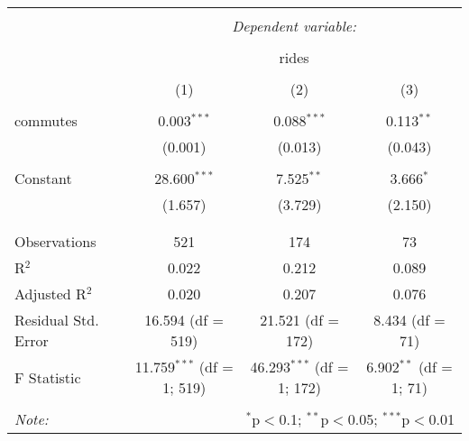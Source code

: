 
\begin{table}[!htbp] \centering 
  \caption{} 
  \label{} 
\begin{tabular}{@{\extracolsep{5pt}}lccc} 
\\[-1.8ex]\hline 
\hline \\[-1.8ex] 
 & \multicolumn{3}{c}{\textit{Dependent variable:}} \\ 
\cline{2-4} 
\\[-1.8ex] & \multicolumn{3}{c}{rides} \\ 
\\[-1.8ex] & (1) & (2) & (3)\\ 
\hline \\[-1.8ex] 
 commutes & 0.003$^{***}$ & 0.088$^{***}$ & 0.113$^{**}$ \\ 
  & (0.001) & (0.013) & (0.043) \\ 
  & & & \\ 
 Constant & 28.600$^{***}$ & 7.525$^{**}$ & 3.666$^{*}$ \\ 
  & (1.657) & (3.729) & (2.150) \\ 
  & & & \\ 
\hline \\[-1.8ex] 
Observations & 521 & 174 & 73 \\ 
R$^{2}$ & 0.022 & 0.212 & 0.089 \\ 
Adjusted R$^{2}$ & 0.020 & 0.207 & 0.076 \\ 
Residual Std. Error & 16.594 (df = 519) & 21.521 (df = 172) & 8.434 (df = 71) \\ 
F Statistic & 11.759$^{***}$ (df = 1; 519) & 46.293$^{***}$ (df = 1; 172) & 6.902$^{**}$ (df = 1; 71) \\ 
\hline 
\hline \\[-1.8ex] 
\textit{Note:}  & \multicolumn{3}{r}{$^{*}$p$<$0.1; $^{**}$p$<$0.05; $^{***}$p$<$0.01} \\ 
\end{tabular} 
\end{table} 
